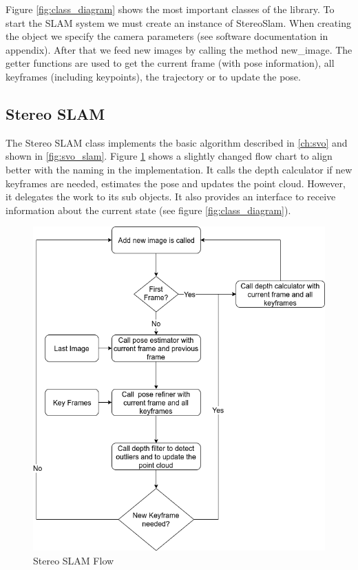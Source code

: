 \documentclass[11pt,a4paper,titlepage,oneside]{report}
\begin{document}
Figure \ref{fig:class_diagram} shows the most important classes of the library. To start the SLAM system we must create an instance of StereoSlam. When creating the object we specify the camera parameters (see software documentation in appendix). After that we feed new images by calling the method new\_image. The getter functions are used to get the current frame (with pose information), all keyframes (including keypoints), the trajectory or to update the pose.

\subsection{Stereo SLAM}

The Stereo SLAM class implements the basic algorithm described in \ref{ch:svo} and shown in \ref{fig:svo_slam}. Figure \ref{fig:flow_stereo_slam} shows a slightly changed flow chart to align better with the naming in the implementation. It calls the depth calculator if new keyframes are needed, estimates the pose and updates the point cloud. However, it delegates the work to its sub objects. It also provides an interface to receive information about the current state (see figure \ref{fig:class_diagram}).

\begin{figure}[H]
  \centering
  \includegraphics[scale=0.3]{img/flow_stereo_slam.png}
  \caption{Stereo SLAM Flow}\label{fig:flow_stereo_slam}
\end{figure}
\end{document}
